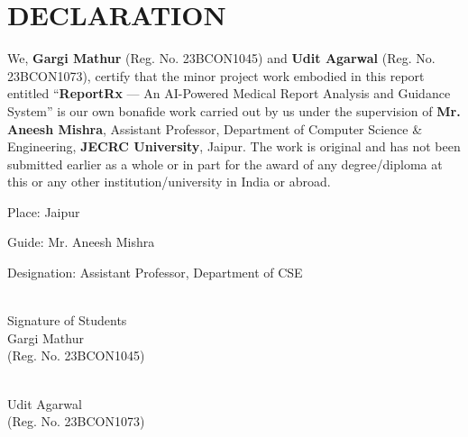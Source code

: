 \setcounter{page}{1}
\thispagestyle{plain}

\chapter*{DECLARATION}

\noindent We, \textbf{Gargi Mathur} (Reg. No. 23BCON1045) and \textbf{Udit Agarwal} (Reg. No. 23BCON1073), certify that the minor project work embodied in this report entitled ``\textbf{ReportRx} --- An AI-Powered Medical Report Analysis and Guidance System'' is our own bonafide work carried out by us under the supervision of \textbf{Mr. Aneesh Mishra}, Assistant Professor, Department of Computer Science \& Engineering, \textbf{JECRC University}, Jaipur. The work is original and has not been submitted earlier as a whole or in part for the award of any degree/diploma at this or any other institution/university in India or abroad.

\vspace{1.5cm}
\noindent Place: Jaipur

\vspace{2cm}

\vspace{1.5cm}
\noindent Guide: Mr. Aneesh Mishra

\noindent Designation: Assistant Professor, Department of CSE

\vspace{1.5cm}
\noindent\begin{minipage}{0.45\textwidth}
    \hrulefill \\
    Signature of Students \\[0.2cm]
    Gargi Mathur \\[0.2cm]
    (Reg. No. 23BCON1045)
\end{minipage}
\hfill
\begin{minipage}{0.45\textwidth}
    \hrulefill \\
    Udit Agarwal \\[0.2cm]
    (Reg. No. 23BCON1073)
\end{minipage}
